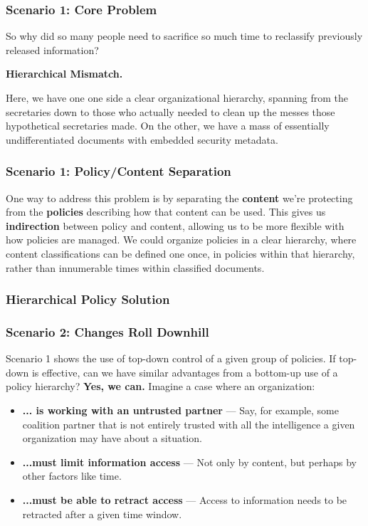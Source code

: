 \documentclass[t,handout, 10pt]{beamer}
\begin{document}
\begin{frame}
\frametitle{Scenario 1: Core Problem}
So why did so many people need to sacrifice so much time to reclassify previously released information?
\newline
\pause
\begin{center}
\textbf{Hierarchical Mismatch.}
\end{center}
\pause
Here, we have one one side a clear organizational hierarchy, spanning from the secretaries down to those who actually needed to clean up the messes those hypothetical secretaries made.  On the other, we have a mass of essentially undifferentiated documents with embedded security metadata.
\end{frame}

\begin{frame}
\frametitle{Scenario 1: Policy/Content Separation}
One way to address this problem is by separating the \textbf{content} we're protecting from the \textbf{policies} describing how that content can be used.
\pause
\newline
\newline
This gives us \textbf{indirection} between policy and content, allowing us to be more flexible with how policies are managed.
\pause
\newline
\newline
We could organize policies in a clear hierarchy, where content classifications can be defined one once, in policies within that hierarchy, rather than innumerable times within classified documents.
\end{frame}

\begin{frame}
\frametitle{Hierarchical Policy Solution}
\end{frame}

\begin{frame}
\frametitle{Scenario 2: Changes Roll Downhill}
Scenario 1 shows the use of top-down control of a given group of policies.  If top-down is effective, can we have similar advantages from a bottom-up use of a policy hierarchy?
\pause
\newline
\newline
\textbf{Yes, we can.}
\pause
\newline
\newline
Imagine a case where an organization:
\begin{itemize}
\item \textbf{... is working with an untrusted partner} --- Say, for example, some coalition partner that is not entirely trusted with all the intelligence a given organization may have about a situation.
\item \textbf{...must limit information access} --- Not only by content, but perhaps by other factors like time.
\item \textbf{...must be able to retract access} --- Access to information needs to be retracted after a given time window.
\end{itemize}
\end{frame}
\end{document}
